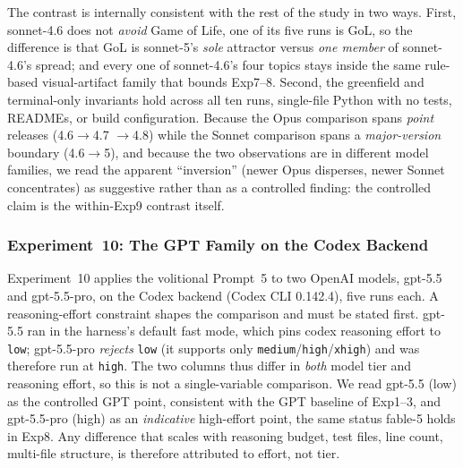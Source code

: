\documentclass{article}
\begin{document}
The contrast is internally consistent with the rest of the study
in two ways. First, sonnet-4.6 does not \emph{avoid} Game of
Life, one of its five runs is GoL, so the difference is that GoL
is sonnet-5's \emph{sole} attractor versus \emph{one member} of
sonnet-4.6's spread; and every one of sonnet-4.6's four topics
stays inside the same rule-based visual-artifact family that
bounds Exp7--8. Second, the greenfield and terminal-only
invariants hold across all ten runs, single-file Python with no
tests, READMEs, or build configuration. Because the Opus
comparison spans \emph{point} releases (4.6$\rightarrow$4.7%
$\rightarrow$4.8) while the Sonnet comparison spans a
\emph{major-version} boundary (4.6$\rightarrow$5), and because
the two observations are in different model families, we read the
apparent ``inversion'' (newer Opus disperses, newer Sonnet
concentrates) as suggestive rather than as a controlled finding:
the controlled claim is the within-Exp9 contrast itself.

\begin{table}[t]
\caption{Experiment~9: Prompt~5 (``Just do something you
  want.'') across the Sonnet family on the same stack as Exp8.
  Identical stack; model is the only variable. LOC reported as
  the median over 5 runs.}
\label{tab:exp9}
\small{}
\end{table}

\subsubsection{Experiment~10: The GPT Family on the Codex Backend}

Experiment~10 applies the volitional Prompt~5 to two OpenAI
models, gpt-5.5 and gpt-5.5-pro, on the Codex backend
(Codex CLI 0.142.4), five runs each. A reasoning-effort
constraint shapes the comparison and must be stated first.
gpt-5.5 ran in the harness's default fast mode, which pins
codex reasoning effort to \texttt{low}; gpt-5.5-pro
\emph{rejects} \texttt{low} (it supports only
\texttt{medium}/\texttt{high}/\texttt{xhigh}) and was therefore
run at \texttt{high}. The two columns thus differ in \emph{both}
model tier and reasoning effort, so this is not a single-variable
comparison. We read gpt-5.5 (low) as the controlled GPT point,
consistent with the GPT baseline of Exp1--3, and gpt-5.5-pro
(high) as an \emph{indicative} high-effort point, the same status
fable-5 holds in Exp8. Any difference that scales with reasoning
budget, test files, line count, multi-file structure, is therefore
attributed to effort, not tier.
\end{document}
